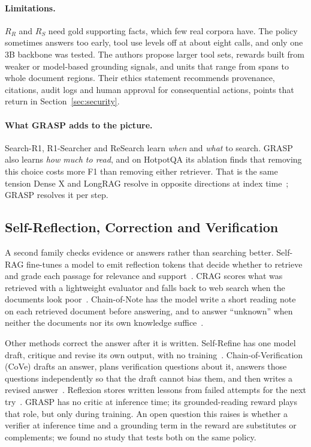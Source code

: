 \documentclass[pdflatex,sn-mathphys-num]{sn-jnl}%
\begin{document}
\paragraph{Limitations.} $R_R$ and $R_S$ need gold supporting facts, which few real corpora have. The policy sometimes answers too early, tool use levels off at about eight calls, and only one 3B backbone was tested. The authors propose larger tool sets, rewards built from weaker or model-based grounding signals, and units that range from spans to whole document regions. Their ethics statement recommends provenance, citations, audit logs and human approval for consequential actions, points that return in Section~\ref{sec:security}.

\paragraph{What GRASP adds to the picture.} Search-R1, R1-Searcher and ReSearch learn \emph{when} and \emph{what} to search. GRASP also learns \emph{how much to read}, and on HotpotQA its ablation finds that removing this choice costs more F1 than removing either retriever. That is the same tension Dense X and LongRAG resolve in opposite directions at index time~\cite{chen2024densex,jiang2024longrag}; GRASP resolves it per step.

\subsection{Self-Reflection, Correction and Verification}
A second family checks evidence or answers rather than searching better. Self-RAG fine-tunes a model to emit reflection tokens that decide whether to retrieve and grade each passage for relevance and support~\cite{asai2024selfrag}. CRAG scores what was retrieved with a lightweight evaluator and falls back to web search when the documents look poor~\cite{yan2024crag}. Chain-of-Note has the model write a short reading note on each retrieved document before answering, and to answer ``unknown'' when neither the documents nor its own knowledge suffice~\cite{yu2024chainofnote}.

Other methods correct the answer after it is written. Self-Refine has one model draft, critique and revise its own output, with no training~\cite{madaan2023selfrefine}. Chain-of-Verification (CoVe) drafts an answer, plans verification questions about it, answers those questions independently so that the draft cannot bias them, and then writes a revised answer~\cite{dhuliawala2024cove}. Reflexion stores written lessons from failed attempts for the next try~\cite{shinn2023reflexion}. GRASP has no critic at inference time; its grounded-reading reward plays that role, but only during training. An open question this raises is whether a verifier at inference time and a grounding term in the reward are substitutes or complements; we found no study that tests both on the same policy.
\end{document}
